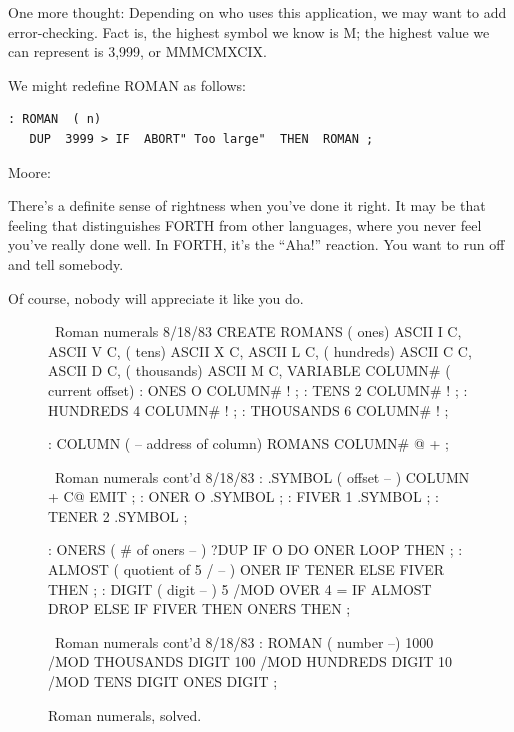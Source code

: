 One more thought: Depending on who uses this application, we may
want to add error-checking. Fact is, the highest symbol we know is M; the
highest value we can represent is 3,999, or MMMCMXCIX.

We might redefine ROMAN as follows:

\begin{verbatim}
: ROMAN  ( n)
   DUP  3999 > IF  ABORT" Too large"  THEN  ROMAN ;
\end{verbatim}

\blackline{2ex}
\noindent Moore:

\begin{tfquot}
There's a definite sense of rightness when you've done it right. It may be
that feeling that distinguishes FORTH from other languages, where you
never feel you've really done well. In FORTH, it's the ``Aha!'' reaction. You
want to run off and tell somebody.

Of course, nobody will appreciate it like you do.
\end{tfquot}
\blackline{1ex}

\begin{figure}[pppp]
\caption{Roman numerals, solved.}
\vspace{1ex}
\setcounter{screen}{20}
\begin{Screen}
\ Roman numerals                                      8/18/83
CREATE ROMANS    ( ones)  ASCII I  C,   ASCII V  C,
                 ( tens)  ASCII X  C,   ASCII L  C,
             ( hundreds)  ASCII C  C,   ASCII D  C,
            ( thousands)  ASCII M  C,
VARIABLE COLUMN#  ( current offset)
: ONES       O COLUMN# ! ;
: TENS       2 COLUMN# ! ;
: HUNDREDS   4 COLUMN# ! ;
: THOUSANDS  6 COLUMN# ! ;

: COLUMN ( -- address of column)  ROMANS  COLUMN# @  + ;

\end{Screen}

\begin{Screen}
\ Roman numerals cont'd                               8/18/83
: .SYMBOL  ( offset -- )  COLUMN +  C@ EMIT ;
: ONER    O .SYMBOL ;
: FIVER   1 .SYMBOL ;
: TENER   2 .SYMBOL ;

: ONERS  ( # of oners -- )
   ?DUP  IF  O DO  ONER  LOOP  THEN ;
: ALMOST  ( quotient of 5 / -- )
   ONER  IF  TENER  ELSE  FIVER  THEN ;
: DIGIT  ( digit -- )
   5 /MOD  OVER  4 = IF  ALMOST  DROP  ELSE  IF FIVER THEN
   ONERS THEN ;

\end{Screen}

\begin{Screen}
\ Roman numerals cont'd                             8/18/83
: ROMAN  ( number --)  1000 /MOD  THOUSANDS DIGIT
                        100 /MOD   HUNDREDS DIGIT
                         10 /MOD       TENS DIGIT
                                       ONES DIGIT  ;

\end{Screen}
\vspace{1ex}
\label{fig-fig4-9}
\end{figure}

